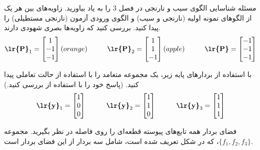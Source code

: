 \documentclass[a4paper,12pt]{report}
\begin{document}
	 \hspace{-2.5cm}\textbf{}\hspace{0.6cm}
	 مسئله شناسایی الگوی سیب و نارنجی در فصل 3 را به یاد بیاورید.
	 زاویه‌های بین هر یک از الگوهای نمونه اولیه (نارنجی و سیب) و الگوی ورودی آزمون (نارنجی مستطیلی) را پیدا کنید. بررسی کنید که زاویه‌ها بصری شهودی دارند.
	 $$
	 \textbf{\lr{P}}_1=
	 \begin{bmatrix}
	 	1 \\ -1 \\ -1
	 \end{bmatrix}(orange) \hspace{1cm}
 	 \textbf{\lr{P}}_2=
 	 \begin{bmatrix}
 	 	1 \\ 1 \\ -1
 	 \end{bmatrix}(apple) \hspace{1cm}
  	 \textbf{\lr{P}}=
  	 \begin{bmatrix}
  	 	-1 \\ -1 \\ -1
  	 \end{bmatrix}
	 $$
	 
	 \hspace{-2.5cm}\textbf{}\hspace{0.6cm}
با استفاده از بردارهای پایه زیر، یک مجموعه متعامد را با استفاده از حالت تعاملی  پیدا کنید. (پاسخ خود را با استفاده از  بررسی کنید.)
	 $$
	 \textbf{\lr{y}}_1=
	 \begin{bmatrix}
	 	1 \\ 0 \\ 0
	 \end{bmatrix} \hspace{1cm}
 	 \textbf{\lr{y}}_2=
 	 \begin{bmatrix}
 	 	1 \\ 1 \\ 0
 	 \end{bmatrix} \hspace{1cm}
  	 \textbf{\lr{y}}_3=
  	 \begin{bmatrix}
  	 	1 \\ 1 \\ 1
  	 \end{bmatrix}
	 $$
	 
	 \hspace{-2.5cm}\textbf{}\hspace{0.6cm}
فضای بردار همه تابع‌های پیوسته قطعه‌ای را روی فاصله \lr{[0 , 1] }در نظر بگیرید. مجموعه 
		$ \{f_1,f_2,f_3\} $،
		که در شکل  تعریف شده است، شامل سه بردار از این فضای بردار است.
		
\end{document}
